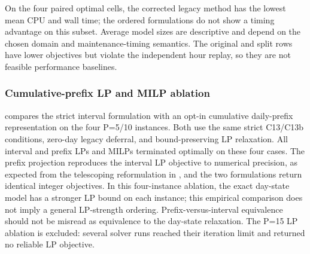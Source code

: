 On the four paired optimal cells, the corrected legacy method has the lowest
mean CPU and wall time; the ordered formulations do not show a timing advantage
on this subset. Average model sizes are descriptive and depend on the chosen
domain and maintenance-timing semantics. The original and split rows have
lower objectives but violate the independent hour replay, so they are not
feasible performance baselines.

\subsubsection{Cumulative-prefix LP and MILP ablation}
\label{subsec:hour_prefix_ablation}

 compares the strict interval formulation with an opt-in cumulative
daily-prefix representation on the four P=5/10 instances. Both use the same
strict C13/C13b conditions, zero-day legacy deferral, and bound-preserving LP
relaxation. All interval and prefix LPs and MILPs terminated optimally on these
four cases. The prefix projection reproduces the interval LP objective to
numerical precision, as expected from the telescoping reformulation in
, and the two formulations return identical integer
objectives. In this four-instance ablation, the exact day-state model has a
stronger LP bound on each instance; this empirical comparison does not imply
a general LP-strength ordering. Prefix-versus-interval equivalence should not
be misread as equivalence to the day-state relaxation. The P=15 LP ablation is excluded:
several solver runs reached their iteration limit and returned no reliable LP
objective.

\begin{table}[t]
\centering\scriptsize
\caption{A-only cumulative-prefix ablation on four tractable instances. LP
columns report optimal lower bounds; the MIP objective is shared by exact
day-state, strict interval, and prefix models. Prefix model size and MIP wall
time are shown for comparison.}
\label{tab:hour_prefix_ablation}
%
\end{table}

